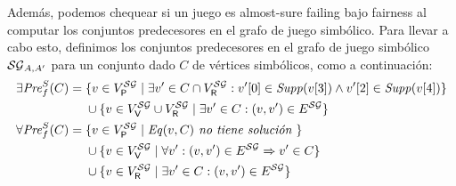 
Además, podemos chequear si un juego es almost-sure failing bajo fairness al computar los conjuntos predecesores en el grafo de juego simbólico. Para llevar a cabo esto, definimos los conjuntos predecesores en el grafo de juego simbólico $\SymbG_{A,A'}$ para un conjunto dado $C$ de vértices simbólicos, como a continuación:
%
{\small
\begin{align*}
	\SymbEFairpre(C) ={}& \{ v \in V^\SymbG_\Probabilistic \mid  \exists v' \in C\cap V^\SymbG_\Refuter : \pr{0}{v'}\in\support{\pr{3}{v}} \land \pr{2}{v'}\in\support{\pr{4}{v}} \} \\
		       & \cup \{ v \in  V^\SymbG_\Verifier \cup V^\SymbG_\Refuter  \mid \exists v' \in C : (v,v') \in E^\SymbG \}\\
	\SymbAFairpre(C) = {}&\{ v \in V^\SymbG_\Probabilistic \mid \Eq(v,C) \textit{  no tiene solución }\} \\
		      & \cup \{ v \in  V^\SymbG_\Verifier   \mid \forall v' : (v,v') \in E^\SymbG \Rightarrow v' \in C \}\\
		      &  \cup \{ v \in  V^\SymbG_\Refuter  \mid \exists v' \in C : (v,v') \in E^\SymbG \}
\end{align*}}%
